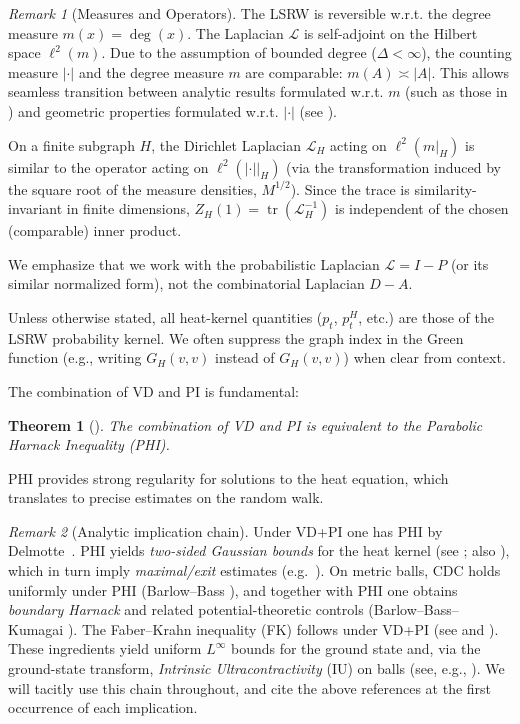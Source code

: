 \documentclass[reqno]{amsart}
\numberwithin{equation}{section}
\newtheorem{theorem}{Theorem}[section]
\theoremstyle{definition}
\theoremstyle{remark}
\newtheorem{remark}[remark]{Remark}
\DeclareMathOperator{\tr}{tr}
\newcommand{\LL}{\mathcal{L}}
\begin{document}
\begin{remark}[Measures and Operators]\label{rem:measures_operators}
The LSRW is reversible w.r.t. the degree measure $m(x)=\deg(x)$. The Laplacian $\LL$ is self-adjoint on the Hilbert space $\ell^2(m)$. Due to the assumption of bounded degree ($\Delta < \infty$), the counting measure $|\cdot|$ and the degree measure $m$ are comparable: $m(A) \asymp |A|$. This allows seamless transition between analytic results formulated w.r.t. $m$ (such as those in ) and geometric properties formulated w.r.t. $|\cdot|$ (see \cite{Coulhon03}).


On a finite subgraph $H$, the Dirichlet Laplacian $\LL_H$ acting on $\ell^2(m|_H)$ is similar to the operator acting on $\ell^2(|\cdot||_H)$ (via the transformation induced by the square root of the measure densities, $M^{1/2}$). Since the trace is similarity-invariant in finite dimensions, $Z_H(1) = \tr(\LL_H^{-1})$ is independent of the chosen (comparable) inner product.


We emphasize that we work with the probabilistic Laplacian $\LL=I-P$ (or its similar normalized form), not the combinatorial Laplacian $D-A$.


Unless otherwise stated, all heat-kernel quantities ($p_t$, $p_t^H$, etc.) are those of the LSRW probability kernel. We often suppress the graph index in the Green function (e.g., writing $G_H(v,v)$ instead of $G_{H}(v,v)$) when clear from context.
\end{remark}

The combination of VD and PI is fundamental:

\begin{theorem}[\cite{Delmotte99}]\label{thm:Delmotte}
The combination of VD and PI is equivalent to the Parabolic Harnack Inequality (PHI).
\end{theorem}

PHI provides strong regularity for solutions to the heat equation, which translates to precise estimates on the random walk.

\begin{remark}[Analytic implication chain]\label{rem:chain}
Under VD+PI one has PHI by Delmotte~\cite{Delmotte99}. PHI yields \emph{two-sided Gaussian bounds} for the heat kernel (see \cite{Delmotte99}; also \cite[§5.3]{Grigoryan09}), which in turn imply
\emph{maximal/exit} estimates (e.g.\ \cite[Thm.~5.5.3]{Grigoryan09}). On metric balls, CDC holds uniformly under PHI (Barlow–Bass \cite{BarlowBass04}), and together with PHI one obtains \emph{boundary Harnack} and related potential-theoretic controls (Barlow–Bass–Kumagai \cite{BarlowBassKumagai09}).
The Faber–Krahn inequality (FK) follows under VD+PI (see \cite[Ch.~8]{Grigoryan09} and \cite{BarlowBass04}).
These ingredients yield uniform $L^\infty$ bounds for the ground state and, via the ground-state transform, \emph{Intrinsic Ultracontractivity} (IU) on balls (see, e.g., \cite{Grigoryan09,BassKumagai08}).
We will tacitly use this chain throughout, and cite the above references at the first occurrence of each implication.
\end{remark}
\end{document}
